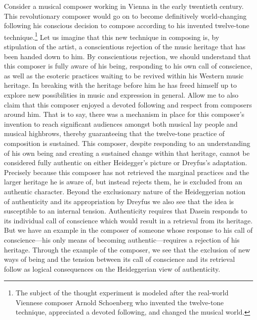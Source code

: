 Consider a musical composer working in Vienna in the early twentieth
century. This revolutionary composer would go on to become definitively
world-changing following his conscious decision to compose according to
his invented twelve-tone technique.\footnote{The subject of the thought
  experiment is modeled after the real-world Viennese composer Arnold
  Schoenberg who invented the twelve-tone technique, appreciated a
  devoted following, and changed the musical world.} Let us imagine that
this new technique in composing is, by stipulation of the artist, a
conscientious rejection of the music heritage that has been handed down
to him. By conscientious rejection, we should understand that this
composer is fully aware of his being, responding to his own call of
conscience, as well as the esoteric practices waiting to be revived
within his Western music heritage. In breaking with the heritage before
him he has freed himself up to explore new possibilities in music and
expression in general. Allow me to also claim that this composer enjoyed
a devoted following and respect from composers around him. That is to
say, there was a mechanism in place for this composer's invention to
reach significant audiences amongst both musical lay people and musical
highbrows, thereby guaranteeing that the twelve-tone practice of
composition is sustained. This composer, despite responding to an
understanding of his own being and creating a sustained change within
that heritage, cannot be considered fully authentic on either
Heidegger's picture or Dreyfus's adaptation. Precisely because this
composer has not retrieved the marginal practices and the larger
heritage he is aware of, but instead rejects them, he is excluded from
an authentic character. Beyond the exclusionary nature of the
Heideggerian notion of authenticity and its appropriation by Dreyfus we
also see that the idea is susceptible to an internal tension.
Authenticity requires that Dasein responds to its individual call of
conscience which would result in a retrieval from its heritage. But we
have an example in the composer of someone whose response to his call of
conscience---his only means of becoming authentic---requires a rejection
of his heritage. Through the example of the composer, we see that the
exclusion of new ways of being and the tension between its call of
conscience and its retrieval follow as logical consequences on the
Heideggerian view of authenticity.

